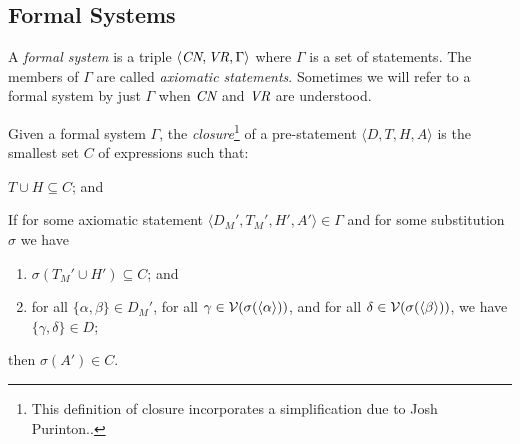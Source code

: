 \subsection{Formal Systems}

A {\em formal system} is a
triple $\langle \mbox{\em CN},\mbox{\em
VR},\Gamma\rangle$ where $\Gamma$ is a set of statements.  The members of
$\Gamma$ are called {\em axiomatic statements}.  Sometimes we will refer to a
formal system by just $\Gamma$ when $\mbox{\em CN}$ and $\mbox{\em VR}$ are
understood.

Given a formal system $\Gamma$, the {\em closure}\footnote{This
definition of closure incorporates a simplification due to
Josh Purinton..} of a
pre-statement
$\langle D,T,H,A \rangle$ is the smallest set $C$ of expressions
such that:
\begin{list}{}{\itemsep 0.0pt}
  \item[1.] $T\cup H\subseteq C$; and
  \item[2.] If for some axiomatic statement
    $\langle D_M',T_M',H',A' \rangle \in
       \Gamma$ and for some substitution
    $\sigma$ we have
    \begin{enumerate}
       \item[a.] $\sigma(T_M' \cup H') \subseteq C$; and
       \item[b.] for all $\{\alpha,\beta\}\in D_M'$, for all $\gamma\in
         {\cal V}(\sigma(\langle \alpha
         \rangle))$, and for all $\delta\in  {\cal V}(\sigma(\langle \beta
         \rangle))$, we have $\{\gamma, \delta\} \in D$;
   \end{enumerate}
   then $\sigma(A') \in C$.
\end{list}

